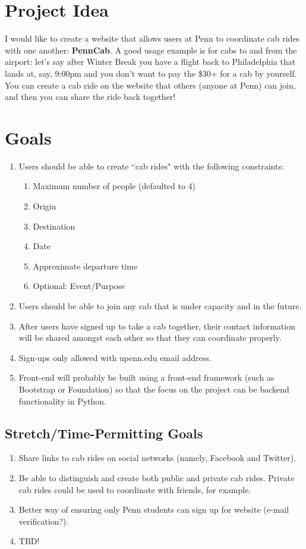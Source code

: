 \documentclass[11pt]{article}
\begin{document}
\section*{Project Idea}

I would like to create a website that allows users at Penn to coordinate cab rides with one another: \textbf{PennCab}. A good usage example is for cabs to and from the airport: let's say after Winter Break you have a flight back to Philadelphia that lands at, say, 9:00pm and you don't want to pay the \$30+ for a cab by yourself. You can create a cab ride on the website that others (anyone at Penn) can join, and then you can share the ride back together!

\section*{Goals}

\begin{enumerate}
\item Users should be able to create ``cab rides" with the following constraints:
    \begin{enumerate}
    \item Maximum number of people (defaulted to 4)
    \item Origin
    \item Destination
    \item Date
    \item Approximate departure time
    \item Optional: Event/Purpose
    \end{enumerate}

\item Users should be able to join any cab that is under capacity and in the future.
\item After users have signed up to take a cab together, their contact information will be shared amongst each other so that they can coordinate properly.
\item Sign-ups only allowed with upenn.edu email address.
\item Front-end will probably be built using a front-end framework (such as Bootstrap or Foundation) so that the focus on the project can be backend functionality in Python.

\end{enumerate}

\subsection*{Stretch/Time-Permitting Goals}
\begin{enumerate}
\item Share links to cab rides on social networks (namely, Facebook and Twitter).
\item Be able to distinguish and create both public and private cab rides. Private cab rides could be used to coordinate with friends, for example.
\item Better way of ensuring only Penn students can sign up for website (e-mail verification?).
\item TBD!
\end{enumerate}
\end{document}
